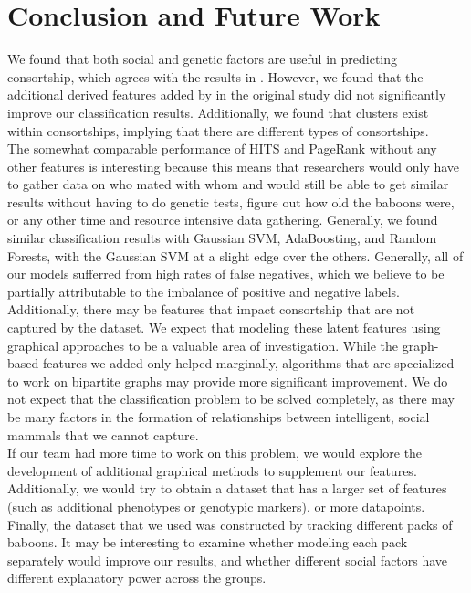 \documentclass[twoside,twocolumn,paper=letter,fontsize=11pt]{article}
\begin{document}
\section{Conclusion and Future Work}

We found that both social and genetic factors are useful in predicting
consortship, which agrees with the results in \cite{Tung:2012}. However, we
found that the additional derived features added by in the original study did
not significantly improve our classification results. Additionally, we found
that clusters exist within consortships, implying that there are different types
of consortships.\\
The somewhat comparable performance of HITS and PageRank without any other features is interesting because this means that researchers would only have to gather data on who mated with whom and would still be able to get similar results without having to do genetic tests, figure out how old the baboons were, or any other time and resource intensive data gathering. 
Generally, we found similar classification results with Gaussian SVM,
AdaBoosting, and Random Forests, with the Gaussian SVM at a slight edge over the
others. Generally, all of our models sufferred from high rates of false
negatives, which we believe to be partially attributable to the imbalance of
positive and negative labels. Additionally, there may be features that impact
consortship that are not captured by the dataset. We expect that modeling these
latent features using graphical approaches to be a valuable area of
investigation. While the graph-based features we added only helped marginally,
algorithms that are specialized to work on bipartite graphs may provide more
significant improvement. We do not expect that the classification problem to be
solved completely, as there may be many factors in the formation of
relationships between intelligent, social mammals that we cannot capture.
\\

If our team had more time to work on this problem, we would explore the
development of additional graphical methods to supplement our features.
Additionally, we would try to obtain a dataset that has a larger set of features
(such as additional phenotypes or genotypic markers), or more datapoints.
Finally, the dataset that we used was constructed by tracking different packs of
baboons. It may be interesting to examine whether modeling each pack separately
would improve our results, and whether different social factors have different
explanatory power across the groups.
\\
\end{document}
